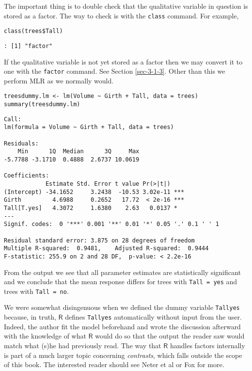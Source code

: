 The important thing is to double check that the qualitative variable
in question is stored as a factor. The way to check is with the
\texttt{class} command. For example,

\begin{verbatim}
class(trees$Tall)
\end{verbatim}

\begin{verbatim}
: [1] "factor"
\end{verbatim}

If the qualitative variable is not yet stored as a factor then we may
convert it to one with the \texttt{factor} command. See Section
\ref{sec-3-1-3}. Other than this we perform MLR as we
normally would.

\begin{verbatim}
treesdummy.lm <- lm(Volume ~ Girth + Tall, data = trees)
summary(treesdummy.lm)
\end{verbatim}

\begin{verbatim}
Call:
lm(formula = Volume ~ Girth + Tall, data = trees)

Residuals:
    Min      1Q  Median      3Q     Max 
-5.7788 -3.1710  0.4888  2.6737 10.0619 

Coefficients:
            Estimate Std. Error t value Pr(>|t|)    
(Intercept) -34.1652     3.2438  -10.53 3.02e-11 ***
Girth         4.6988     0.2652   17.72  < 2e-16 ***
Tall[T.yes]   4.3072     1.6380    2.63   0.0137 *  
---
Signif. codes:  0 '***' 0.001 '**' 0.01 '*' 0.05 '.' 0.1 ' ' 1

Residual standard error: 3.875 on 28 degrees of freedom
Multiple R-squared:  0.9481,	Adjusted R-squared:  0.9444 
F-statistic: 255.9 on 2 and 28 DF,  p-value: < 2.2e-16
\end{verbatim}

From the output we see that all parameter estimates are statistically
significant and we conclude that the mean response differs for trees
with \texttt{Tall = yes} and trees with \texttt{Tall = no}.

\begin{rem}
We were somewhat disingenuous when we defined the dummy variable
\texttt{Tallyes} because, in truth, \(\mathsf{R}\) defines \texttt{Tallyes}
automatically without input from the user. Indeed, the
author fit the model beforehand and wrote the discussion afterward
with the knowledge of what \(\mathsf{R}\) would do so that the output
the reader saw would match what (s)he had previously read. The way
that \(\mathsf{R}\) handles factors internally is part of a much
larger topic concerning \emph{contrasts}, which falls outside the scope of
this book. The interested reader should see Neter et al
\cite{Neter1996} or Fox \cite{Fox1997} for more.
\end{rem}

